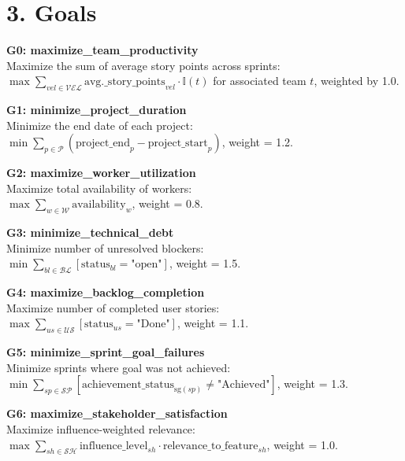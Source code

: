 \documentclass[12pt]{article}
\begin{document}
\section{3. Goals}

\item \textbf{G0: maximize\_team\_productivity} \\
    Maximize the sum of average story points across sprints: \\
    $\max \sum_{vel \in \mathcal{VEL}} \text{avg.\_story\_points}_{vel} \cdot \mathbb{I}(t)$ for associated team $t$, weighted by 1.0.

    \item \textbf{G1: minimize\_project\_duration} \\
    Minimize the end date of each project: \\
    $\min \sum_{p \in \mathcal{P}} (\text{project\_end}_p - \text{project\_start}_p)$, weight = 1.2.

    \item \textbf{G2: maximize\_worker\_utilization} \\
    Maximize total availability of workers: \\
    $\max \sum_{w \in \mathcal{W}} \text{availability}_w$, weight = 0.8.

    \item \textbf{G3: minimize\_technical\_debt} \\
    Minimize number of unresolved blockers: \\
    $\min \sum_{bl \in \mathcal{BL}} \left[ \text{status}_{bl} = \text{"open"} \right]$, weight = 1.5.

    \item \textbf{G4: maximize\_backlog\_completion} \\
    Maximize number of completed user stories: \\
    $\max \sum_{us \in \mathcal{US}} \left[ \text{status}_{us} = \text{"Done"} \right]$, weight = 1.1.

    \item \textbf{G5: minimize\_sprint\_goal\_failures} \\
    Minimize sprints where goal was not achieved: \\
    $\min \sum_{sp \in \mathcal{SP}} \left[ \text{achievement\_status}_{\text{sg}(sp)} \neq \text{"Achieved"} \right]$, weight = 1.3.

    \item \textbf{G6: maximize\_stakeholder\_satisfaction} \\
    Maximize influence-weighted relevance: \\
    $\max \sum_{sh \in \mathcal{SH}} \text{influence\_level}_{sh} \cdot \text{relevance\_to\_feature}_{sh}$, weight = 1.0.
\end{document}
